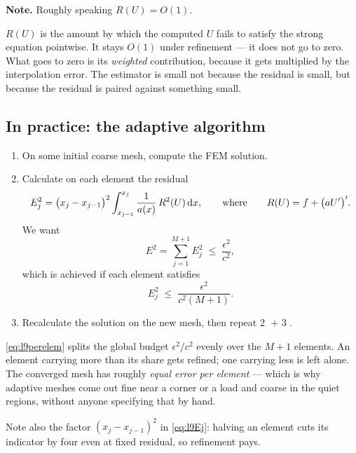 \medskip\noindent\textbf{Note.} Roughly speaking $R(U)=O(1)$.

\begin{intuition}
$R(U)$ is the amount by which the computed $U$ fails to satisfy the strong
equation pointwise. It stays $O(1)$ under refinement --- it does not go to zero.
What goes to zero is its \emph{weighted} contribution, because it gets
multiplied by the interpolation error. The estimator is small not because the
residual is small, but because the residual is paired against something small.
\end{intuition}

\subsection*{In practice: the adaptive algorithm}

\begin{enumerate}[label=\textcircled{\scriptsize\arabic*},leftmargin=2.2em,itemsep=5pt]

\item On some initial coarse mesh, compute the FEM solution.

\item Calculate on each element the residual
\begin{equation}\label{eq:l9Ej}
  E_{j}^{2}=\bigl(x_{j}-x_{j-1}\bigr)^{2}
            \int_{x_{j-1}}^{x_{j}}\frac{1}{a(x)}\,R^{2}(U)\,\mathrm{d} x ,
  \qquad\text{where}\qquad
  R(U)=f+\bigl(aU'\bigr)' .
\end{equation}
We want
\begin{equation}\label{eq:l9target}
  E^{2}=\sum_{j=1}^{M+1}E_{j}^{2}\;\le\;\frac{\epsilon^{2}}{c^{2}} ,
\end{equation}
which is achieved if each element satisfies
\begin{equation}\label{eq:l9perelem}
  E_{j}^{2}\;\le\;\frac{\epsilon^{2}}{c^{2}(M+1)} .
\end{equation}

\item Recalculate the solution on the new mesh, then repeat
\textcircled{\scriptsize2} $+$ \textcircled{\scriptsize3}.

\end{enumerate}

\begin{intuition}[equidistribution]
\eqref{eq:l9perelem} splits the global budget $\epsilon^{2}/c^{2}$ evenly over
the $M+1$ elements. An element carrying more than its share gets refined; one
carrying less is left alone. The converged mesh has roughly \emph{equal error
per element} --- which is why adaptive meshes come out fine near a corner or a
load and coarse in the quiet regions, without anyone specifying that by hand.

Note also the factor $(x_j-x_{j-1})^2$ in \eqref{eq:l9Ej}: halving an element
cuts its indicator by four even at fixed residual, so refinement pays.
\end{intuition}

